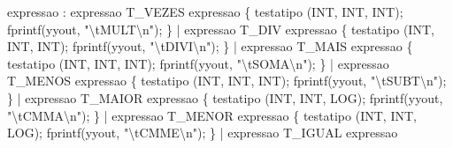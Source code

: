 \documentclass[
  brazilian,
  letterpaper,
]{book}
\newenvironment{Shaded}{\begin{snugshade}}{\end{snugshade}}
\newcommand{\NormalTok}[1]{\textcolor[rgb]{0.00,0.23,0.31}{#1}}
\newcommand{\OperatorTok}[1]{\textcolor[rgb]{0.37,0.37,0.37}{#1}}
\newcommand{\SpecialCharTok}[1]{\textcolor[rgb]{0.37,0.37,0.37}{#1}}
\newcommand{\StringTok}[1]{\textcolor[rgb]{0.13,0.47,0.30}{#1}}
\theoremstyle{plain}
\theoremstyle{definition}
\theoremstyle{remark}
\begin{document}
\begin{Shaded}
\begin{Highlighting}[]
\NormalTok{expressao}
    \OperatorTok{:}\NormalTok{ expressao T\_VEZES expressao}
        \OperatorTok{\{}\NormalTok{ testatipo }\OperatorTok{(}\NormalTok{INT}\OperatorTok{,}\NormalTok{ INT}\OperatorTok{,}\NormalTok{ INT}\OperatorTok{);}\NormalTok{ fprintf}\OperatorTok{(}\NormalTok{yyout}\OperatorTok{,} \StringTok{"}\SpecialCharTok{\textbackslash{}t}\StringTok{MULT}\SpecialCharTok{\textbackslash{}n}\StringTok{"}\OperatorTok{);} \OperatorTok{\}}
    \OperatorTok{|}\NormalTok{ expressao T\_DIV expressao}
        \OperatorTok{\{}\NormalTok{ testatipo }\OperatorTok{(}\NormalTok{INT}\OperatorTok{,}\NormalTok{ INT}\OperatorTok{,}\NormalTok{ INT}\OperatorTok{);}\NormalTok{ fprintf}\OperatorTok{(}\NormalTok{yyout}\OperatorTok{,} \StringTok{"}\SpecialCharTok{\textbackslash{}t}\StringTok{DIVI}\SpecialCharTok{\textbackslash{}n}\StringTok{"}\OperatorTok{);} \OperatorTok{\}}
    \OperatorTok{|}\NormalTok{ expressao T\_MAIS expressao}
        \OperatorTok{\{}\NormalTok{ testatipo }\OperatorTok{(}\NormalTok{INT}\OperatorTok{,}\NormalTok{ INT}\OperatorTok{,}\NormalTok{ INT}\OperatorTok{);}\NormalTok{ fprintf}\OperatorTok{(}\NormalTok{yyout}\OperatorTok{,} \StringTok{"}\SpecialCharTok{\textbackslash{}t}\StringTok{SOMA}\SpecialCharTok{\textbackslash{}n}\StringTok{"}\OperatorTok{);} \OperatorTok{\}}
    \OperatorTok{|}\NormalTok{ expressao T\_MENOS expressao}
        \OperatorTok{\{}\NormalTok{ testatipo }\OperatorTok{(}\NormalTok{INT}\OperatorTok{,}\NormalTok{ INT}\OperatorTok{,}\NormalTok{ INT}\OperatorTok{);}\NormalTok{ fprintf}\OperatorTok{(}\NormalTok{yyout}\OperatorTok{,} \StringTok{"}\SpecialCharTok{\textbackslash{}t}\StringTok{SUBT}\SpecialCharTok{\textbackslash{}n}\StringTok{"}\OperatorTok{);} \OperatorTok{\}}
    \OperatorTok{|}\NormalTok{ expressao T\_MAIOR expressao}
        \OperatorTok{\{}\NormalTok{ testatipo }\OperatorTok{(}\NormalTok{INT}\OperatorTok{,}\NormalTok{ INT}\OperatorTok{,}\NormalTok{ LOG}\OperatorTok{);}\NormalTok{ fprintf}\OperatorTok{(}\NormalTok{yyout}\OperatorTok{,} \StringTok{"}\SpecialCharTok{\textbackslash{}t}\StringTok{CMMA}\SpecialCharTok{\textbackslash{}n}\StringTok{"}\OperatorTok{);} \OperatorTok{\}}
    \OperatorTok{|}\NormalTok{ expressao T\_MENOR expressao}
        \OperatorTok{\{}\NormalTok{ testatipo }\OperatorTok{(}\NormalTok{INT}\OperatorTok{,}\NormalTok{ INT}\OperatorTok{,}\NormalTok{ LOG}\OperatorTok{);}\NormalTok{ fprintf}\OperatorTok{(}\NormalTok{yyout}\OperatorTok{,} \StringTok{"}\SpecialCharTok{\textbackslash{}t}\StringTok{CMME}\SpecialCharTok{\textbackslash{}n}\StringTok{"}\OperatorTok{);} \OperatorTok{\}}
    \OperatorTok{|}\NormalTok{ expressao T\_IGUAL expressao}

\end{Highlighting}
\end{Shaded}
\end{document}
